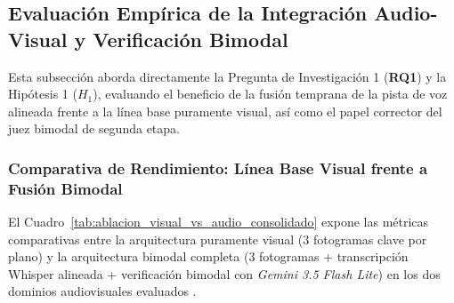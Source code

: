 \subsection{Evaluación Empírica de la Integración Audio-Visual y Verificación Bimodal}
\label{subsec:evaluacion_audio_visual_e2e}

Esta subsección aborda directamente la Pregunta de Investigación 1 (\textbf{RQ1}) y la Hipótesis 1 ($H_1$), evaluando el beneficio de la fusión temprana de la pista de voz alineada frente a la línea base puramente visual, así como el papel corrector del juez bimodal de segunda etapa.

\subsubsection{Comparativa de Rendimiento: Línea Base Visual frente a Fusión Bimodal}
El Cuadro~\ref{tab:ablacion_visual_vs_audio_consolidado} expone las métricas comparativas entre la arquitectura puramente visual ($3$ fotogramas clave por plano) y la arquitectura bimodal completa ($3$ fotogramas + transcripción Whisper alineada + verificación bimodal con \textit{Gemini 3.5 Flash Lite}) en los dos dominios audiovisuales evaluados \cite{gemini_emb2_docs, video_rac2025}.

